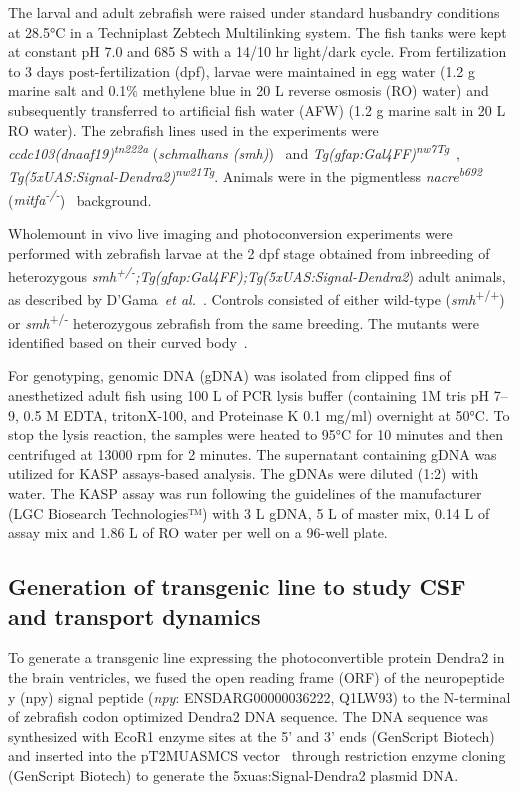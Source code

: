\documentclass{WileyMSP-template}
\begin{document}
The larval and adult zebrafish were raised under standard husbandry
conditions at 28.5°C in a Techniplast Zebtech Multilinking system.
The fish tanks were kept at constant pH 7.0 and 685 \textmu S with a
14/10 hr light/dark cycle.
From fertilization to 3 days post-fertilization (dpf), larvae were maintained in egg
water (1.2 g marine salt and 0.1\% methylene blue in 20 L reverse osmosis (RO) water)
and subsequently transferred to artificial fish water (AFW)
(1.2 g marine salt in 20 L RO water). The zebrafish lines used in the experiments were
\emph{ccdc103(dnaaf19)\textsuperscript{tn222a}}
(\emph{schmalhans (smh)})~\cite{Jau-NianChen1997Left-rightZebrafish}
and \emph{Tg(gfap:Gal4FF)\textsuperscript{nw7Tg}}~\cite{DiazVerdugo2019Glia-neuronSeizures},
\emph{Tg(5xUAS:Signal-Dendra2)\textsuperscript{nw21Tg}}.
Animals were in the pigmentless \emph{nacre\textsuperscript{b692}}
(\emph{mitfa\textsuperscript{-/-}})~\cite{JamesA.Lister1999NacreFate} background.

Wholemount in vivo live imaging and photoconversion
experiments were performed with zebrafish larvae at the 2 dpf stage obtained from inbreeding of heterozygous
\emph{smh\textsuperscript{+/-};Tg(gfap:Gal4FF);Tg(5xUAS:Signal-Dendra2})
adult animals, as described by D'Gama~\emph{et al.}~\cite{DGama2024Cilia-mediatedBrain}.
Controls consisted of either wild-type (\emph{smh}\textsuperscript{+/+})
or \emph{smh}\textsuperscript{+/-} heterozygous zebrafish from the same breeding.
The mutants were identified based on their curved body~\cite{Jau-NianChen1997Left-rightZebrafish}.

For genotyping, genomic DNA (gDNA) was isolated from clipped fins of anesthetized adult
fish using 100 \textmu L of PCR lysis buffer (containing 1M tris pH 7--9, 0.5 M EDTA,
tritonX-100, and Proteinase K 0.1 mg/ml) overnight at 50°C.
To stop the lysis reaction, the samples were heated to 95°C for 10 minutes
and then centrifuged at 13000 rpm for 2 minutes.
The supernatant containing gDNA was utilized for KASP assays-based analysis.
The gDNAs were diluted (1:2) with water. 
The KASP assay was run following the guidelines of the
manufacturer (LGC Biosearch Technologies™) with 3 \textmu L gDNA,
5 \textmu L of master mix, 0.14 \textmu L of assay mix
and 1.86 \textmu L of RO water per well on a 96-well plate.

\subsection{Generation of transgenic line to study CSF and transport dynamics} 
To generate a transgenic line expressing the photoconvertible protein Dendra2 in
the brain ventricles, we fused the open reading frame (ORF)
of the neuropeptide y (npy) signal peptide
(\emph{npy}: ENSDARG00000036222, Q1LW93) to the N-terminal of
zebrafish codon optimized Dendra2 DNA sequence.
The DNA sequence was synthesized with EcoR1 enzyme sites at the 5’ and
3’ ends (GenScript Biotech) and inserted into the
pT2MUASMCS vector~\cite{Asakawa2008GeneticZebrafish}
through restriction enzyme cloning (GenScript Biotech)
to generate the 5xuas:Signal-Dendra2 plasmid DNA.
\end{document}
